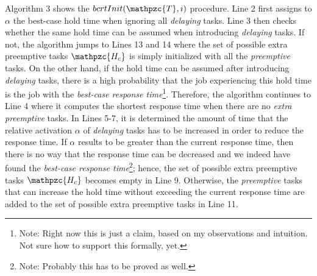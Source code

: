 \documentclass[fleqn]{article}
\begin{document}
Algorithm 3 shows the $bcrtInit(\mathpzc{T},i)$ procedure. Line 2 first assigns to $\alpha$ the  best-case hold time when ignoring all \textit{delaying} tasks. Line 3 then checks whether the same hold time can be assumed when introducing \textit{delaying} tasks. If not, the algorithm jumps to Lines 13 and 14 where the set of possible extra preemptive tasks $\mathpzc{H_c}$ is simply initialized with all the \textit{preemptive} tasks. On the other hand, if the hold time can be assumed after introducing \textit{delaying} tasks, there is a high probability that the job experiencing this hold time is the job with the \textit{best-case response time}\footnote{Note: Right now this is just a claim, based on my observations and intuition. Not sure how to support this formally, yet.}. Therefore, the algorithm continues to Line 4 where it computes the shortest response time when there are no \textit{extra preemptive} tasks. In Lines 5-7, it is determined the amount of time that the relative activation $\alpha$ of \textit{delaying} tasks has to be increased in order to reduce the response time. If $\alpha$ results to be greater than the current response time, then there is no way that the response time can be decreased and we indeed have found the \textit{best-case response time}\footnote{Note: Probably this has to be proved as well.}; hence, the set of possible extra preemptive tasks $\mathpzc{H_c}$ becomes empty in Line 9. Otherwise, the \textit{preemptive} tasks that can increase the hold time without exceeding the current response time are added to the set of possible extra preemptive tasks in Line 11.

\end{document}
